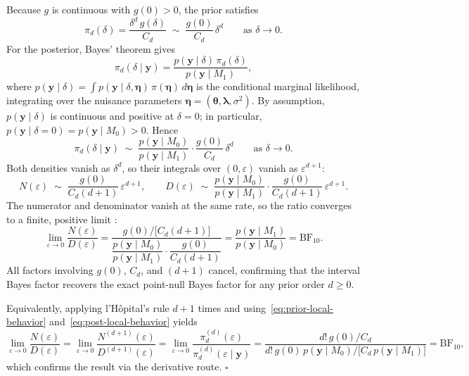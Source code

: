 \documentclass{article}
\begin{document}
Because $g$ is continuous with $g(0)>0$, the prior satisfies
\begin{equation}
\label{eq:prior-local-behavior}
\pi_d(\delta) = \frac{\delta^d\,g(\delta)}{C_d}
  \;\sim\; \frac{g(0)}{C_d}\,\delta^d
  \qquad\text{as } \delta\to 0.
\end{equation}
For the posterior, Bayes' theorem gives
\[
\pi_d(\delta\mid\mathbf{y})
  = \frac{p(\mathbf{y}\mid\delta)\,\pi_d(\delta)}
         {p(\mathbf{y}\mid M_1)},
\]
where $p(\mathbf{y}\mid\delta)
  = \int p(\mathbf{y}\mid\delta,\boldsymbol{\eta})\,
    \pi(\boldsymbol{\eta})\,d\boldsymbol{\eta}$
is the conditional marginal likelihood, integrating over the
nuisance parameters $\boldsymbol{\eta}=(\boldsymbol{\theta},
\boldsymbol{\lambda},\sigma^2)$.
By assumption, $p(\mathbf{y}\mid\delta)$ is continuous and positive
at $\delta=0$; in particular,
$p(\mathbf{y}\mid\delta=0)=p(\mathbf{y}\mid M_0)>0$.
Hence
\begin{equation}
\label{eq:post-local-behavior}
\pi_d(\delta\mid\mathbf{y})
  \;\sim\; \frac{p(\mathbf{y}\mid M_0)}{p(\mathbf{y}\mid M_1)}
    \cdot \frac{g(0)}{C_d}\,\delta^d
  \qquad\text{as } \delta\to 0.
\end{equation}
Both densities vanish as $\delta^d$, so their integrals over
$(0,\varepsilon)$ vanish as $\varepsilon^{d+1}$:
\[
N(\varepsilon) \;\sim\; \frac{g(0)}{C_d(d+1)}\,\varepsilon^{d+1},
\qquad
D(\varepsilon) \;\sim\;
  \frac{p(\mathbf{y}\mid M_0)}{p(\mathbf{y}\mid M_1)}
  \cdot \frac{g(0)}{C_d(d+1)}\,\varepsilon^{d+1}.
\]
The numerator and denominator vanish at the same rate, so the
ratio converges to a finite, positive limit
\parencite[cf.][Section~2]{wetzels2010encompassing}:
\begin{equation}
\label{eq:interval-limit-proof}
\lim_{\varepsilon\to 0}
  \frac{N(\varepsilon)}{D(\varepsilon)}
= \frac{g(0)/\bigl[C_d(d+1)\bigr]}
       {\dfrac{p(\mathbf{y}\mid M_0)}{p(\mathbf{y}\mid M_1)}
         \cdot \dfrac{g(0)}{C_d(d+1)}}
= \frac{p(\mathbf{y}\mid M_1)}{p(\mathbf{y}\mid M_0)}
= \mathrm{BF}_{10}.
\end{equation}
All factors involving $g(0)$, $C_d$, and $(d+1)$ cancel,
confirming that the interval Bayes factor recovers the exact
point-null Bayes factor for any prior order $d\ge 0$.
 
Equivalently, applying l'H\^opital's rule $d+1$ times and
using~\eqref{eq:prior-local-behavior}
and~\eqref{eq:post-local-behavior} yields
\[
\lim_{\varepsilon\to 0}
  \frac{N(\varepsilon)}{D(\varepsilon)}
= \lim_{\varepsilon\to 0}
  \frac{N^{(d+1)}(\varepsilon)}{D^{(d+1)}(\varepsilon)}
= \lim_{\varepsilon\to 0}
  \frac{\pi_d^{(d)}(\varepsilon)}
       {\pi_d^{(d)}(\varepsilon\mid\mathbf{y})}
= \frac{d!\,g(0)/C_d}
       {d!\,g(0)\,p(\mathbf{y}\mid M_0)/
         \bigl[C_d\,p(\mathbf{y}\mid M_1)\bigr]}
= \mathrm{BF}_{10},
\]
which confirms the result via the derivative route.
\hfill$\square$
\end{document}
